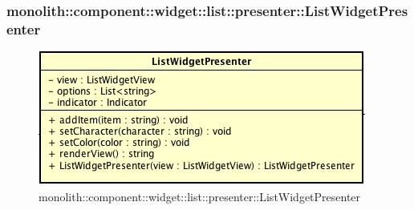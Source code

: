 \subsubsection{monolith::component::widget::list::presenter::ListWidgetPresenter}

\label{monolith::component::widget::list::presenter::ListWidgetPresenter}
\begin{figure}[ht]
	\centering
	\includegraphics[scale=0.5]{Sezioni/SottosezioniST/img/ListWidgetPresenter.png}
	\caption{monolith::component::widget::list::presenter::ListWidgetPresenter}
\end{figure}


